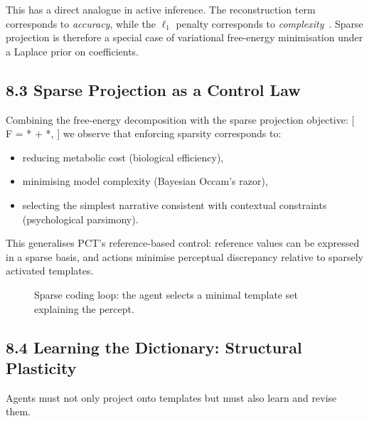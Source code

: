 \documentclass[11pt,a4paper,twoside]{article}
\begin{document}
This has a direct analogue in active inference. The reconstruction term corresponds to \emph{accuracy}, while the $\ell_1$ penalty corresponds to \emph{complexity}~\cite{bogacz2017,friston2010free}. Sparse projection is therefore a special case of variational free-energy minimisation under a Laplace prior on coefficients.

\subsection{8.3 Sparse Projection as a Control Law}

Combining the free-energy decomposition with the sparse projection objective:
[
F =
*{}
+
*{},
]
we observe that enforcing sparsity corresponds to:
\begin{itemize}
\item reducing metabolic cost (biological efficiency),
\item minimising model complexity (Bayesian Occam's razor),
\item selecting the simplest narrative consistent with contextual constraints (psychological parsimony).
\end{itemize}

This generalises PCT’s reference-based control: reference values can be expressed in a sparse basis, and actions minimise perceptual discrepancy relative to sparsely activated templates.

\begin{figure}[h]
\centering
{}
\caption{Sparse coding loop: the agent selects a minimal template set explaining the percept.}
\end{figure}

\subsection{8.4 Learning the Dictionary: Structural Plasticity}

Agents must not only project onto templates but must also learn and revise them.
\end{document}
